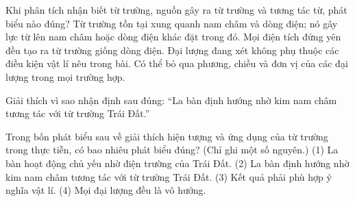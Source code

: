 \begin{ex}
Khi phân tích nhận biết từ trường, nguồn gây ra từ trường và tương tác từ, phát biểu nào đúng?
\choice
{\True Từ trường tồn tại xung quanh nam châm và dòng điện; nó gây lực từ lên nam châm hoặc dòng điện khác đặt trong đó.}
{Mọi điện tích đứng yên đều tạo ra từ trường giống dòng điện.}
{Đại lượng đang xét không phụ thuộc các điều kiện vật lí nêu trong bài.}
{Có thể bỏ qua phương, chiều và đơn vị của các đại lượng trong mọi trường hợp.}
\end{ex}

\begin{bt}
Giải thích vì sao nhận định sau đúng: “La bàn định hướng nhờ kim nam châm tương tác với từ trường Trái Đất.”
\end{bt}

\begin{ex}
Trong bốn phát biểu sau về giải thích hiện tượng và ứng dụng của từ trường trong thực tiễn, có bao nhiêu phát biểu đúng? (Chỉ ghi một số nguyên.) (1) La bàn hoạt động chủ yếu nhờ điện trường của Trái Đất. (2) La bàn định hướng nhờ kim nam châm tương tác với từ trường Trái Đất. (3) Kết quả phải phù hợp ý nghĩa vật lí. (4) Mọi đại lượng đều là vô hướng.
\end{ex}

